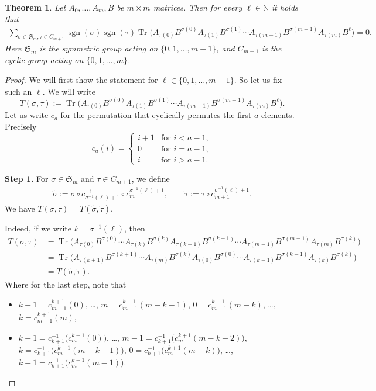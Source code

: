 \documentclass[pdftex]{sigma}
\numberwithin{equation}{section}
\newtheorem{Theorem}{Theorem}[section]
\DeclareMathOperator{\Tr}{Tr}
\DeclareMathOperator{\sgn}{sgn}
\begin{document}
\begin{Theorem} \label{thm:linRel}
	Let $A_0,\dots,A_m,B$ be $m \times m$ matrices. Then for every $\ell \in {\mathbb N}$ it holds that
	\begin{gather} \label{eq:linRel}
	\sum_{\sigma \in \mathfrak{S}_m, \tau \in C_{m+1}}\!\!\!\!{\sgn(\sigma)\sgn(\tau)\Tr\big(A_{\tau(0)}B^{\sigma(0)}A_{\tau(1)}B^{\sigma(1)} \cdots A_{\tau(m-1)}B^{\sigma(m-1)}A_{\tau(m)}B^{\ell}\big)}=0.\!\!\!
	\end{gather}
	Here $\mathfrak{S}_m$ is the symmetric group acting on $\{0,1,\dots,m-1\}$, and $C_{m+1}$ is the cyclic group acting on $\{0,1,\dots,m\}$.
\end{Theorem}
\begin{proof}
	We will first show the statement for $\ell \in \{0,1,\dots,m-1\}$. So let us fix such an $\ell$. We will write
	\[T(\sigma,\tau) := \Tr\big(A_{\tau(0)}B^{\sigma(0)}A_{\tau(1)}B^{\sigma(1)} \cdots A_{\tau(m-1)}B^{\sigma(m-1)}A_{\tau(m)}B^{\ell}\big).\]
	Let us write $c_{a}$ for the permutation that cyclically permutes the first $a$ elements. Precisely
	\[c_{a}(i) =
	\begin{cases}
		i+1 & \text{for } i<a-1, \\
		0 & \text{for } i=a-1, \\
		i & \text{for } i>a-1.
	\end{cases}\]

{\bf Step 1.}
	For $\sigma \in \mathfrak{S}_m$ and $\tau \in C_{m+1}$, we define{\samepage
	\begin{gather*}
	\tilde{\sigma} := \sigma \circ c_{\sigma^{-1}(\ell)+1}^{-1} \circ c_{m}^{\sigma^{-1}(\ell)+1}, \qquad
	\tilde{\tau} := \tau \circ c_{m+1}^{\sigma^{-1}(\ell)+1}.
	\end{gather*}
	We have $T(\sigma,\tau) = T(\tilde{\sigma}, \tilde{\tau})$.}
	
	Indeed, if we write $k=\sigma^{-1}(\ell)$, then
	\begin{align*}
	T(\sigma,\tau) &= \Tr\big(A_{\tau(0)}B^{\sigma(0)}\cdots A_{\tau(k)}B^{\sigma(k)}A_{\tau(k+1)}B^{\sigma(k+1)} \cdots A_{\tau(m-1)}B^{\sigma(m-1)}A_{\tau(m)}B^{\sigma(k)}\big)\\
	&=\Tr\big(A_{\tau(k+1)}B^{\sigma(k+1)} \cdots A_{\tau(m)}B^{\sigma(k)}A_{\tau(0)}B^{\sigma(0)} \cdots A_{\tau(k-1)}B^{\sigma(k-1)}A_{\tau(k)}B^{\sigma(k)}\big)\\
	&=T(\tilde{\sigma}, \tilde{\tau}).
	\end{align*}
	Where for the last step, note that
	\begin{itemize}\itemsep=0pt
		\item $k+1 = c_{m+1}^{k+1}(0)$, \dots, $m=c_{m+1}^{k+1}(m-k-1)$, $0=c_{m+1}^{k+1}(m-k)$, \dots, $k=c_{m+1}^{k+1}(m)$,
		\item $k+1=c_{k+1}^{-1}\big(c_m^{k+1}(0)\big)$, \dots, $m-1=c_{k+1}^{-1}\big(c_m^{k+1}(m-k-2)\big)$, $k=c_{k+1}^{-1}\big(c_m^{k+1}(m-k-1)\big)$, $0=c_{k+1}^{-1}\big(c_m^{k+1}(m-k)\big)$, \dots, $k-1=c_{k+1}^{-1}\big(c_m^{k+1}(m-1)\big)$.
	\end{itemize}


\end{proof}
\end{document}
